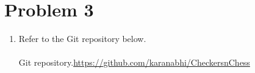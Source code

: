 \documentclass[12pt]{article}
\begin{document}
\section*{Problem 3}
\begin{enumerate}[label=(\alph*)]

 \item Refer to the Git repository below.\\\\
Git repository.\url {https://github.com/karanabhi/CheckersnChess}
\end{enumerate}
\end{document}

